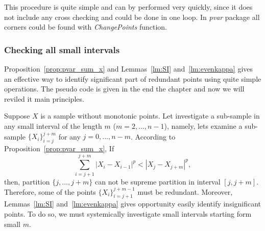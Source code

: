 \documentclass[12pt, a4paper]{article}
\numberwithin{equation}{section}
\begin{document}
This procedure is quite simple and
 can by performed very quickly, since it does not include
any cross checking and could be done in one loop.
In \emph{pvar} package all corners could be found with \emph{ChangePoints} function.



\subsubsection{Checking all small intervals}
\label{sec:CheckSmallIntervals}

Proposition~\ref{prop:pvar_sum_x} and 
Lemmas~\ref{lm:SI} and~\ref{lm:evenkappa} gives an effective 
way to identify significant part of 
redundant points 
using quite simple operations. 
The pseudo code is given in the end the chapter and
now we will reviled it main principles.

Suppose $X$ is a sample without monotonic points. 
Let investigate a sub-sample in
any small interval of the length $m$ ($m=2,\dots,n-1$), 
namely, lets examine a sub-sample 
$\{X_{i}\}_{i=j}^{j+m}$
for any $j=0,...,n-m$.
According to Proposition~\ref{prop:pvar_sum_x},
If 
\begin{equation}\label{eq:dropsamll1}
  \sum_{i=j+1}^{j+m} |X_{i}-X_{i-1}|^p < |X_j-X_{j+m}|^p,
\end{equation}
then,
partition $\{j,\dots,j+m\}$ 
can not be supreme partition in interval
$[j,j+m]$. 
Therefore, some of the points $\{X_{i}\}_{i=j+1}^{j+m-1}$
must be redundant.
Moreover, Lemmas~\ref{lm:SI} and~\ref{lm:evenkappa} 
gives opportunity easily identify 
insignificant points. To do so, we must 
systemically investigate small intervals starting form
small $m$.
\end{document}
